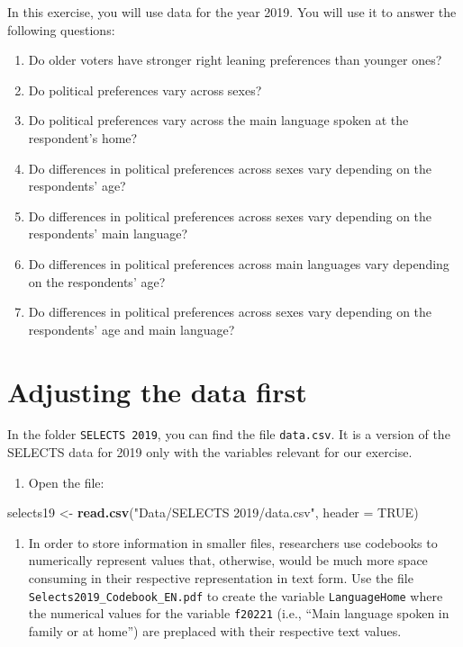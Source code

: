 \documentclass[
]{book}
\newenvironment{Shaded}{\begin{snugshade}}{\end{snugshade}}
\newcommand{\AttributeTok}[1]{\textcolor[rgb]{0.13,0.29,0.53}{#1}}
\newcommand{\ConstantTok}[1]{\textcolor[rgb]{0.56,0.35,0.01}{#1}}
\newcommand{\FunctionTok}[1]{\textcolor[rgb]{0.13,0.29,0.53}{\textbf{#1}}}
\newcommand{\NormalTok}[1]{#1}
\newcommand{\OtherTok}[1]{\textcolor[rgb]{0.56,0.35,0.01}{#1}}
\newcommand{\StringTok}[1]{\textcolor[rgb]{0.31,0.60,0.02}{#1}}
\providecommand{\tightlist}{%
  \setlength{\itemsep}{0pt}\setlength{\parskip}{0pt}}
\begin{document}
In this exercise, you will use data for the year 2019. You will use it to answer the following questions:

\begin{enumerate}
\def\labelenumi{\arabic{enumi}.}
\tightlist
\item
  Do older voters have stronger right leaning preferences than younger ones?
\item
  Do political preferences vary across sexes?
\item
  Do political preferences vary across the main language spoken at the respondent's home?
\item
  Do differences in political preferences across sexes vary depending on the respondents' age?
\item
  Do differences in political preferences across sexes vary depending on the respondents' main language?
\item
  Do differences in political preferences across main languages vary depending on the respondents' age?
\item
  Do differences in political preferences across sexes vary depending on the respondents' age and main language?
\end{enumerate}

\hypertarget{adjusting-the-data-first}{%
\section{Adjusting the data first}\label{adjusting-the-data-first}}

In the folder \texttt{SELECTS\ 2019}, you can find the file \texttt{data.csv}. It is a version of the SELECTS data for 2019 only with the variables relevant for our exercise.

\begin{enumerate}
\def\labelenumi{\arabic{enumi}.}
\tightlist
\item
  Open the file:
\end{enumerate}

\begin{Shaded}
\begin{Highlighting}[]
\NormalTok{selects19 }\OtherTok{\textless{}{-}} \FunctionTok{read.csv}\NormalTok{(}\StringTok{"Data/SELECTS 2019/data.csv"}\NormalTok{, }\AttributeTok{header =} \ConstantTok{TRUE}\NormalTok{)}
\end{Highlighting}
\end{Shaded}

\begin{enumerate}
\def\labelenumi{\arabic{enumi}.}
\setcounter{enumi}{1}
\tightlist
\item
  In order to store information in smaller files, researchers use codebooks to numerically represent values that, otherwise, would be much more space consuming in their respective representation in text form. Use the file \texttt{Selects2019\_Codebook\_EN.pdf} to create the variable \texttt{LanguageHome} where the numerical values for the variable \texttt{f20221} (i.e., ``Main language spoken in family or at home'') are preplaced with their respective text values.
\end{enumerate}
\end{document}

